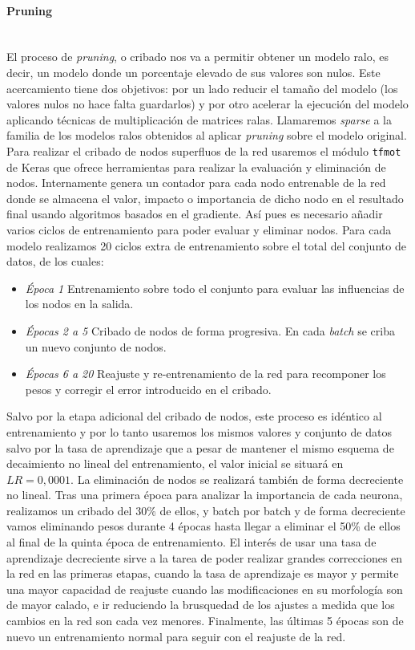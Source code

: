 \paragraph{Pruning}\\
El proceso de \textit{pruning}, o cribado nos va a permitir obtener un modelo ralo, es decir, un modelo donde un porcentaje elevado de sus valores son nulos. Este acercamiento tiene dos objetivos: por un lado reducir el tamaño del modelo (los valores nulos no hace falta guardarlos) y por otro acelerar la ejecución del modelo aplicando técnicas de multiplicación de matrices ralas. Llamaremos \textit{sparse} a la familia de los modelos ralos obtenidos al aplicar \textit{pruning} sobre el modelo original. Para realizar el cribado de nodos superfluos de la red usaremos el módulo \texttt{tfmot} de Keras que ofrece herramientas para realizar la evaluación y eliminación de nodos. Internamente genera un contador para cada nodo entrenable de la red donde se almacena el valor, impacto o importancia de dicho nodo en el resultado final usando algoritmos basados en el gradiente. Así pues es necesario añadir varios ciclos de entrenamiento para poder evaluar y eliminar nodos. Para cada modelo realizamos 20 ciclos extra de entrenamiento sobre el total del conjunto de datos, de los cuales:
\begin{itemize}
  \item \textsl{Época 1} Entrenamiento sobre todo el conjunto para evaluar las influencias de los nodos en la salida.
  \item \textsl{Épocas 2 a 5} Cribado de nodos de forma progresiva. En cada \textit{batch} se criba un nuevo conjunto de nodos.
  \item \textsl{Épocas 6 a 20} Reajuste y re-entrenamiento de la red para recomponer los pesos y corregir el error introducido en el cribado.
\end{itemize}

Salvo por la etapa adicional del cribado de nodos, este proceso es idéntico al entrenamiento y por lo tanto usaremos los mismos valores y conjunto de datos salvo por la tasa de aprendizaje que a pesar de mantener el mismo esquema de decaimiento no lineal del entrenamiento, el valor inicial se situará en $LR=0,0001$. La eliminación de nodos se realizará también de forma decreciente no lineal. Tras una primera época para analizar la importancia de cada neurona, realizamos un cribado del 30\% de ellos, y batch por batch y de forma decreciente vamos eliminando pesos durante 4 épocas hasta llegar a eliminar el 50\% de ellos al final de la quinta época de entrenamiento. El interés de usar una tasa de aprendizaje decreciente sirve a la tarea de poder realizar grandes correcciones en la red en las primeras etapas, cuando la tasa de aprendizaje es mayor y permite una mayor capacidad de reajuste cuando las modificaciones en su morfología son de mayor calado,  e ir reduciendo la brusquedad de los ajustes a medida que los cambios en la red son cada vez menores. Finalmente, las últimas 5 épocas son de nuevo un entrenamiento normal para seguir con el reajuste de la red. 

